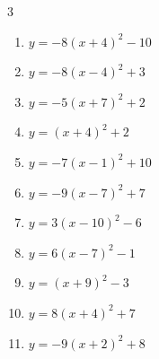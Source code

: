 \begin{multicols}{3}
\begin{enumerate}
        \phantom{$\displaystyle 頂点\left( 6 , 5 \right)$}

  \item $\displaystyle y=-8\left( x+4\right)^{2}-10$

        \phantom{$\displaystyle 頂点\left( -4 , -10 \right)$}

  \item $\displaystyle y=-8\left( x-4\right)^{2}+3$

        \phantom{$\displaystyle 頂点\left( 4 , 3 \right)$}

  \item $\displaystyle y=-5\left( x+7\right)^{2}+2$

        \phantom{$\displaystyle 頂点\left( -7 , 2 \right)$}

\columnbreak %

\resetques

  \item $\displaystyle y=\left( x+4\right)^{2}+2$

        \phantom{$\displaystyle 頂点\left( -4 , 2 \right)$}

  \item $\displaystyle y=-7\left( x-1\right)^{2}+10$

        \phantom{$\displaystyle 頂点\left( 1 , 10 \right)$}

  \item $\displaystyle y=-9\left( x-7\right)^{2}+7$

        \phantom{$\displaystyle 頂点\left( 7 , 7 \right)$}

  \item $\displaystyle y=3\left( x-10\right)^{2}-6$

        \phantom{$\displaystyle 頂点\left( 10 , -6 \right)$}

  \item $\displaystyle y=6\left( x-7\right)^{2}-1$

        \phantom{$\displaystyle 頂点\left( 7 , -1 \right)$}

  \item $\displaystyle y=\left( x+9\right)^{2}-3$

        \phantom{$\displaystyle 頂点\left( -9 , -3 \right)$}

  \item $\displaystyle y=8\left( x+4\right)^{2}+7$

        \phantom{$\displaystyle 頂点\left( -4 , 7 \right)$}

  \item $\displaystyle y=-9\left( x+2\right)^{2}+8$


\end{enumerate}
\end{multicols}
